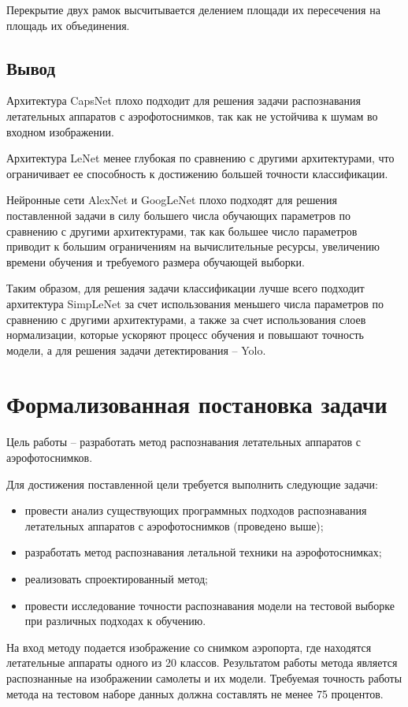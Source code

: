 Перекрытие двух рамок высчитывается делением площади их пересечения на площадь их объединения.


\subsection{Вывод}
Архитектура CapsNet плохо подходит для решения задачи распознавания летательных аппаратов с аэрофотоснимков, так как не устойчива к шумам во входном изображении.

Архитектура LeNet менее глубокая по сравнению с другими архитектурами, что ограничивает ее способность к достижению большей точности классификации.

Нейронные сети AlexNet и GoogLeNet плохо подходят для решения поставленной задачи в силу большего числа обучающих параметров по сравнению с другими архитектурами, так как большее число параметров приводит к большим ограничениям на вычислительные ресурсы, увеличению времени обучения и требуемого размера обучающей выборки.

Таким образом, для решения задачи классификации лучше всего подходит архитектура SimpLeNet за счет использования меньшего числа параметров по сравнению с другими архитектурами, а также за счет использования слоев нормализации, которые ускоряют процесс обучения и повышают точность модели, а для решения задачи детектирования -- Yolo.

\section{Формализованная постановка задачи}
Цель работы -- разработать метод распознавания летательных аппаратов с аэрофотоснимков.

Для достижения поставленной цели требуется выполнить следующие задачи:
\begin{itemize}
	\item провести анализ существующих программных подходов распознавания летательных аппаратов с аэрофотоснимков (проведено выше);
	\item разработать метод распознавания летальной техники на аэрофотоснимках;
	\item реализовать спроектированный метод;
	\item провести исследование точности распознавания модели на тестовой выборке при различных подходах к обучению.
\end{itemize}

На вход методу подается изображение со снимком аэропорта, где находятся летательные аппараты одного из 20 классов. Результатом работы метода является распознанные на изображении самолеты и их модели. Требуемая точность работы метода на тестовом наборе данных должна составлять не менее 75 процентов.


